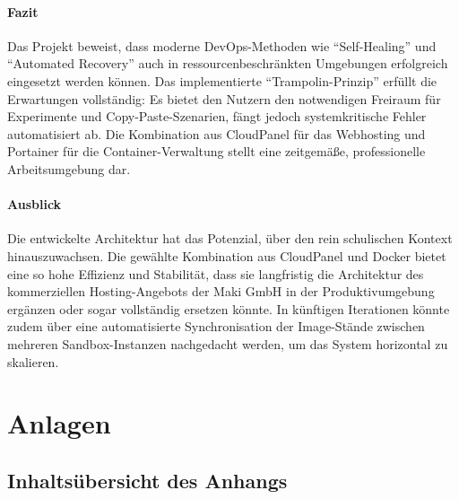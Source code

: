 \documentclass[11pt,
a4paper,
numbers=nonperiod,
footsepline,
oneside,
numbers=noenddot,
bibliography=totoc
]{scrartcl}
\begin{document}
\paragraph{Fazit}
Das Projekt beweist, dass moderne DevOps-Methoden wie "`Self-Healing"' und "`Automated Recovery"' auch in ressourcenbeschränkten Umgebungen erfolgreich eingesetzt werden können. Das implementierte "`Trampolin-Prinzip"' erfüllt die Erwartungen vollständig: Es bietet den Nutzern den notwendigen Freiraum für Experimente und Copy-Paste-Szenarien, fängt jedoch systemkritische Fehler automatisiert ab. Die Kombination aus CloudPanel für das Webhosting und Portainer für die Container-Verwaltung stellt eine zeitgemäße, professionelle Arbeitsumgebung dar.

\paragraph{Ausblick}
Die entwickelte Architektur hat das Potenzial, über den rein schulischen Kontext hinauszuwachsen. Die gewählte Kombination aus CloudPanel und Docker bietet eine so hohe Effizienz und Stabilität, dass sie langfristig die Architektur des kommerziellen Hosting-Angebots der Maki GmbH in der Produktivumgebung ergänzen oder sogar vollständig ersetzen könnte. In künftigen Iterationen könnte zudem über eine automatisierte Synchronisation der Image-Stände zwischen mehreren Sandbox-Instanzen nachgedacht werden, um das System horizontal zu skalieren.
\newpage


\appendix

\setcounter{page}{1}

\section{Anlagen}
\label{sec:anlagen}

\subsection*{Inhaltsübersicht des Anhangs}
\end{document}
